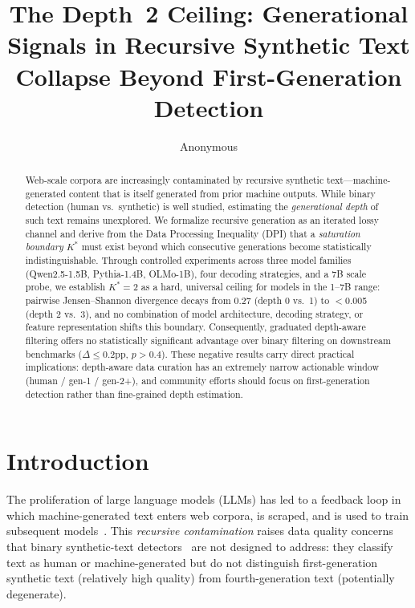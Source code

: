 \documentclass[11pt,a4paper]{article}
\title{The Depth~2 Ceiling: Generational Signals in Recursive Synthetic Text\\Collapse Beyond First-Generation Detection}
\author{Anonymous}
\begin{document}
\maketitle

\begin{abstract}
Web-scale corpora are increasingly contaminated by recursive synthetic text---machine-generated content that is itself generated from prior machine outputs.
While binary detection (human vs.\ synthetic) is well studied, estimating the \emph{generational depth} of such text remains unexplored.
We formalize recursive generation as an iterated lossy channel and derive from the Data Processing Inequality (DPI) that a \emph{saturation boundary} $K^*$ must exist beyond which consecutive generations become statistically indistinguishable.
Through controlled experiments across three model families (Qwen2.5-1.5B, Pythia-1.4B, OLMo-1B), four decoding strategies, and a 7B scale probe, we establish $K^*=2$ as a hard, universal ceiling for models in the 1--7B range: pairwise Jensen--Shannon divergence decays from 0.27 (depth 0 vs.\ 1) to $<$0.005 (depth 2 vs.\ 3), and no combination of model architecture, decoding strategy, or feature representation shifts this boundary.
Consequently, graduated depth-aware filtering offers no statistically significant advantage over binary filtering on downstream benchmarks ($\Delta\leq$0.2pp, $p>0.4$).
These negative results carry direct practical implications: depth-aware data curation has an extremely narrow actionable window (human / gen-1 / gen-2+), and community efforts should focus on first-generation detection rather than fine-grained depth estimation.
\end{abstract}

\section{Introduction}

The proliferation of large language models (LLMs) has led to a feedback loop in which machine-generated text enters web corpora, is scraped, and is used to train subsequent models~\cite{shumailov2024ai}.
This \emph{recursive contamination} raises data quality concerns that binary synthetic-text detectors~\cite{mitchell2023detectgpt,hans2024binoculars} are not designed to address: they classify text as human or machine-generated but do not distinguish first-generation synthetic text (relatively high quality) from fourth-generation text (potentially degenerate).
\end{document}
